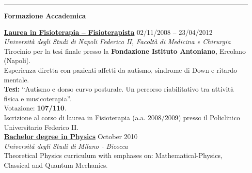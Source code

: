 \documentclass[a4paper]{article}
\newcommand{\block}[1]{\hrule \vspace{0.2cm} \textbf{\Large #1} \vspace{0.2cm}}
\newcommand{\voice}[5]{\href{#4}{\textbf{#1}} \hfill #2 \\ \textit{#3} \\ {\small #5} \vspace{0.2cm} \\}
\begin{document}
\begin{minipage}[t]{0.6\columnwidth}
    \block{Formazione Accademica}

    
\voice{Laurea in Fisioterapia – Fisioterapista}
{02/11/2008 – 23/04/2012}
{Università degli Studi di Napoli Federico II, Facoltà di Medicina e Chirurgia}
{}
{
Tirocinio per la tesi finale presso la \textbf{Fondazione Istituto Antoniano}, Ercolano (Napoli).\\
Esperienza diretta con pazienti affetti da autismo, sindrome di Down e ritardo mentale.\\
\textbf{Tesi:} “Autismo e dorso curvo posturale. Un percorso riabilitativo tra attività fisica e musicoterapia”.\\
Votazione: \textbf{107/110}.\\
Iscrizione al corso di laurea in Fisioterapia (a.a. 2008/2009) presso il Policlinico Universitario Federico II.
}
    \voice{Bachelor degree in Physics}
        {October 2010}
        {Universit\'a degli Studi di Milano - Bicocca}
        {https://www.fisica.unimib.it/en}       
        {Theoretical Physics curriculum with emphases on: Mathematical-Physics, Classical and Quantum Mechanics.\vspace{-0.25cm}}

















\end{minipage} 
\hfill
\end{document}
